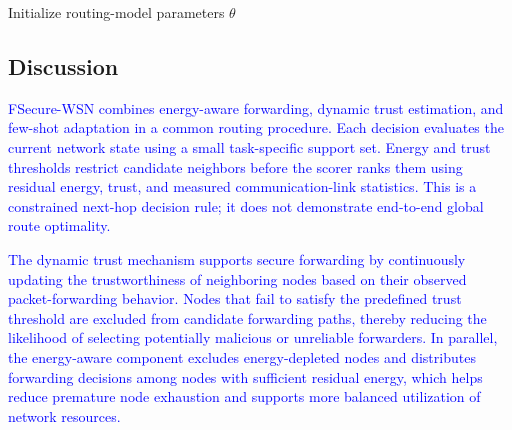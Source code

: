 \documentclass[pdflatex,sn-mathphys-num]{sn-jnl}
\begin{document}
\begin{algorithm}[t]
\caption{FSecure-WSN: constrained few-shot next-hop ranking}\label{alg:fsecure}
Initialize routing-model parameters $\theta$\;
\end{algorithm}

\subsection{Discussion}

\textcolor{blue}{FSecure-WSN combines energy-aware forwarding, dynamic trust estimation, and few-shot adaptation in a common routing procedure. Each decision evaluates the current network state using a small task-specific support set. Energy and trust thresholds restrict candidate neighbors before the scorer ranks them using residual energy, trust, and measured communication-link statistics. This is a constrained next-hop decision rule; it does not demonstrate end-to-end global route optimality.}

\textcolor{blue}{The dynamic trust mechanism supports secure forwarding by continuously updating the trustworthiness of neighboring nodes based on their observed packet-forwarding behavior. Nodes that fail to satisfy the predefined trust threshold are excluded from candidate forwarding paths, thereby reducing the likelihood of selecting potentially malicious or unreliable forwarders. In parallel, the energy-aware component excludes energy-depleted nodes and distributes forwarding decisions among nodes with sufficient residual energy, which helps reduce premature node exhaustion and supports more balanced utilization of network resources.}
\end{document}

